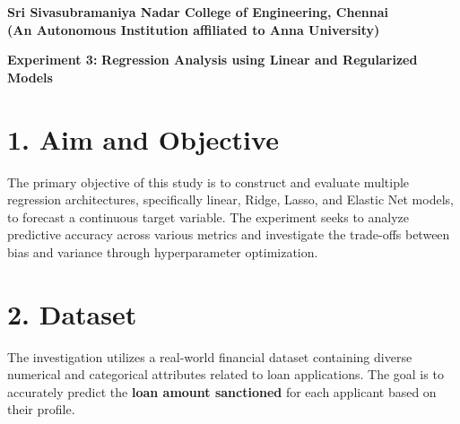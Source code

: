 \documentclass[11pt]{article}
\begin{document}
\begin{center}
\textbf{\Large Sri Sivasubramaniya Nadar College of Engineering, Chennai}\\
\textbf{(An Autonomous Institution affiliated to Anna University)}
\end{center}

\begin{table}[h]
\renewcommand{\arraystretch}{1.4}
\end{table}

\begin{center}
\textbf{Experiment 3:}
\textbf{Regression Analysis using Linear and Regularized Models}
\end{center}

\section*{1. Aim and Objective}
The primary objective of this study is to construct and evaluate multiple regression architectures, specifically linear, Ridge, Lasso, and Elastic Net models, to forecast a continuous target variable. The experiment seeks to analyze predictive accuracy across various metrics and investigate the trade-offs between bias and variance through hyperparameter optimization.

\section*{2. Dataset}
The investigation utilizes a real-world financial dataset containing diverse numerical and categorical attributes related to loan applications. The goal is to accurately predict the \textbf{loan amount sanctioned} for each applicant based on their profile.
\end{document}
